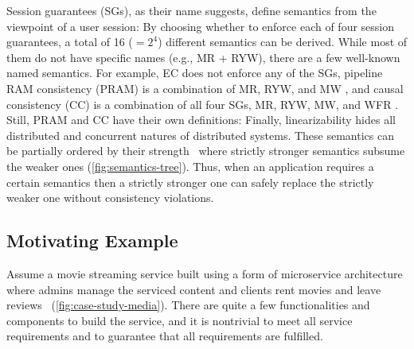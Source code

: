 Session guarantees (SGs), as their name suggests, define semantics from the
viewpoint of a user session:
By choosing whether to enforce each of four session guarantees, a
total of 16 ($=2^4$) different semantics can be derived. While most
of them do not have specific names (e.g., MR + RYW), there are a few
well-known named semantics. For example, EC does not enforce any of
the SGs, pipeline RAM consistency (PRAM) is a combination of MR, RYW, and
MW \cite{brzezinski2004session}, and causal consistency (CC) is a
combination of all four SGs, MR, RYW, MW, and
WFR \cite{sessiontocausal}. Still, PRAM \cite{pram} and
CC \cite{causaldef} have their own definitions:
Finally, linearizability hides all distributed and concurrent natures
of distributed systems.
These semantics can be partially ordered by their
strength~\cite{viotti2016consistency} where strictly stronger
semantics subsume the weaker ones (\cref{fig:semantics-tree}). Thus,
when an application requires a certain semantics then a strictly
stronger one can safely replace the strictly weaker one without consistency violations.

\subsection{Motivating Example}
\label{subsec:eg}
Assume a movie streaming service built using a form of
microservice architecture where admins manage the serviced
content and clients rent movies and leave reviews~\cite{gan2019an}
(\cref{fig:case-study-media}).
There are quite a few functionalities and components to build the
service, and it is nontrivial to meet all service requirements
and to guarantee that all requirements are fulfilled.

